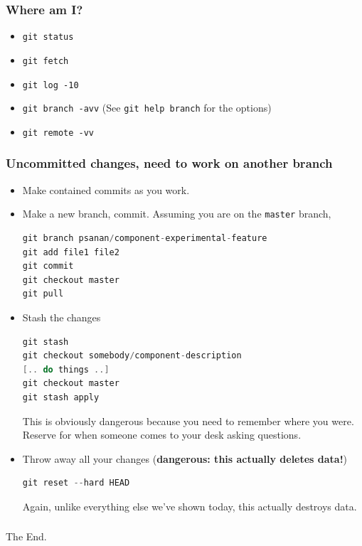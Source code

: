 \documentclass{beamer}
\begin{document}

\begin{frame}[fragile]
\frametitle{Where am I?}

\begin{itemize}
\item \lstinline{git status}
\item \lstinline{git fetch}
\item \lstinline{git log -10}
\item \lstinline{git branch -avv} (See \lstinline{git help branch} for the options)
\item \lstinline{git remote -vv}
\end{itemize}



\end{frame}

\begin{frame}[fragile]
\frametitle{Uncommitted changes, need to work on another branch}
\begin{itemize}
\item Make contained commits as you work. 
\item Make a new branch, commit. Assuming you are on the \texttt{master} branch,
\begin{lstlisting}[language=C++]
git branch psanan/component-experimental-feature
git add file1 file2
git commit 
git checkout master 
git pull
\end{lstlisting}
\item Stash the changes
\begin{lstlisting}[language=C++]
git stash
git checkout somebody/component-description
[.. do things ..]
git checkout master
git stash apply
\end{lstlisting}
This is obviously dangerous because you need to remember where you were. Reserve for when someone comes to your desk asking questions.
\item Throw away all your changes (\textbf{dangerous: this actually deletes data!})
\begin{lstlisting}[language=C++]
git reset --hard HEAD
\end{lstlisting}
Again, unlike everything else we've shown today, this actually destroys data.
\end{itemize}
\end{frame}

\begin{frame}[fragile]
\frametitle{}
The End. \\



\end{frame}
\end{document}
